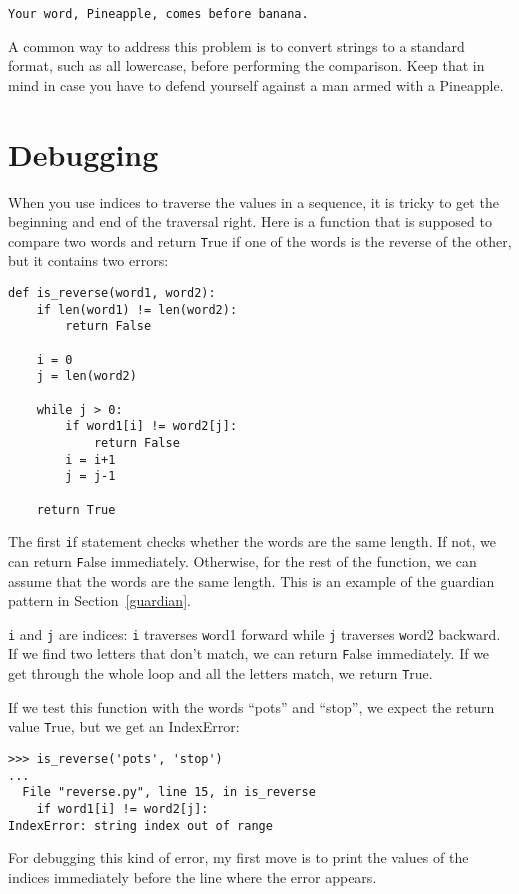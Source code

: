 \documentclass[
DIV=11,
fontsize=13,
twoside,
headinclude=false,
titlepage=firstiscover,
abstract=true,
headsepline=true,
footsepline=true,
chapterprefix=true, %
headings=big,
bibliography=totoc,%
captions=tableheading
]{scrbook}
\theoremstyle{definition}
\begin{document}
\begin{lstlisting}
Your word, Pineapple, comes before banana.
\end{lstlisting}
%
A common way to address this problem is to convert strings to a
standard format, such as all lowercase, before performing the
comparison.  Keep that in mind in case you have to defend yourself
against a man armed with a Pineapple.


\section{Debugging}

When you use indices to traverse the values in a sequence,
it is tricky to get the beginning and end of the traversal
right.  Here is a function that is supposed to compare two
words and return {\texttt True} if one of the words is the reverse
of the other, but it contains two errors:

\begin{lstlisting}
def is_reverse(word1, word2):
    if len(word1) != len(word2):
        return False
    
    i = 0
    j = len(word2)

    while j > 0:
        if word1[i] != word2[j]:
            return False
        i = i+1
        j = j-1

    return True
\end{lstlisting}
%
The first {\texttt if} statement checks whether the words are the
same length.  If not, we can return {\texttt False} immediately.
Otherwise, for the rest of the function, we can assume that the words
are the same length.  This is an example of the guardian pattern
in Section~\ref{guardian}.

{\texttt i} and {\texttt j} are indices: {\texttt i} traverses {\texttt word1}
forward while {\texttt j} traverses {\texttt word2} backward.  If we find
two letters that don't match, we can return {\texttt False} immediately.
If we get through the whole loop and all the letters match, we
return {\texttt True}.

If we test this function with the words ``pots'' and ``stop'', we
expect the return value {\texttt True}, but we get an IndexError:

\begin{lstlisting}
>>> is_reverse('pots', 'stop')
...
  File "reverse.py", line 15, in is_reverse
    if word1[i] != word2[j]:
IndexError: string index out of range
\end{lstlisting}
%
For debugging this kind of error, my first move is to
print the values of the indices immediately before the line
where the error appears.
\end{document}
